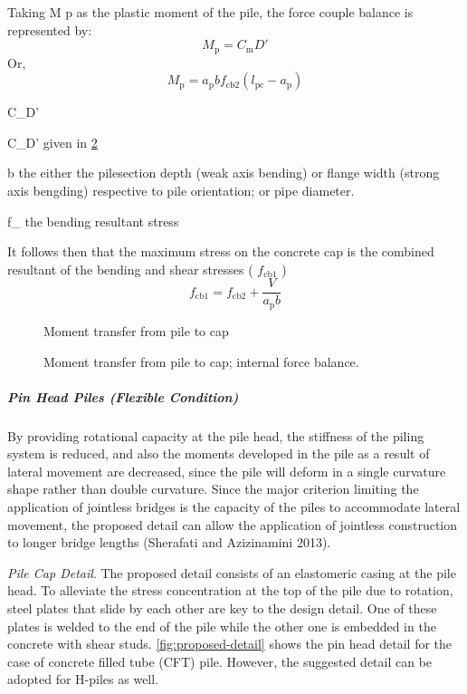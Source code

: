 Taking M p as the plastic moment of the pile, the force couple balance is represented by:
\begin{equation}
  M_\text{p}=C_\text{m}D'
\end{equation}
Or,
\begin{equation}
  M_\text{p}=a_\text{p}bf_\text{cb2}(l_\text{pc}-a_\text{p})
\end{equation}
\begin{EqDesc}{C_D'}
  \item[C_\text{m}\text{和}D'] given in \cref{fig:moment-transfer-pile-cap-internal-balance}
  \item[b] the either the pilesection depth (weak axis bending) or flange width (strong axis bengding) respective to pile orientation; or pipe diameter.
  \item[f_\text{cb2}] the bending resultant stress
\end{EqDesc}

It follows then that the maximum stress on the concrete cap is the combined resultant of the bending and shear stresses ( $f_\text{cb1}$ )
\begin{equation}
  f_\text{cb1} =f_\text{cb2} +\frac{V}{a_\text{p}b}
\end{equation}

\begin{figure}
  \caption{Moment transfer from pile to cap}
  \label{fig:moment-transfer-pile-cap}
\end{figure}

\begin{figure}
  \caption{Moment transfer from pile to cap; internal force balance.}
  \label{fig:moment-transfer-pile-cap-internal-balance}
\end{figure}


\subparagraph{Pin Head Piles (Flexible Condition)}
By providing rotational capacity at the pile head, the stiffness of the piling system is reduced, and also the
moments developed in the pile as a result of lateral movement are decreased, since the pile will deform in a single
curvature shape rather than double curvature. Since the major criterion limiting the application of jointless bridges is
the capacity of the piles to accommodate lateral movement, the proposed detail can allow the application of jointless
construction to longer bridge lengths (Sherafati and Azizinamini 2013).

\emph{Pile Cap Detail}. The proposed detail consists of an elastomeric casing at the pile head. To alleviate the stress
concentration at the top of the pile due to rotation, steel plates that slide by each other are key to the design detail. One
of these plates is welded to the end of the pile while the other one is embedded in the concrete with shear studs.
\cref{fig:proposed-detail} shows the pin head detail for the case of concrete filled tube (CFT) pile. However, the suggested detail
can be adopted for H-piles as well.

